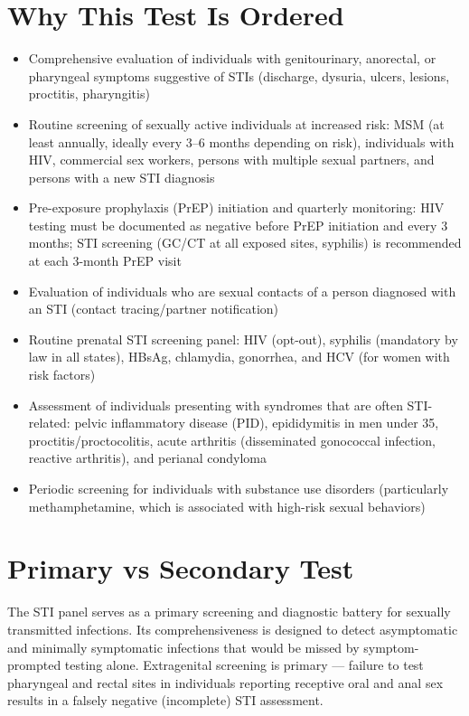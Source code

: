\section*{Why This Test Is Ordered}
\begin{itemize}
  \item Comprehensive evaluation of individuals with genitourinary, anorectal, or pharyngeal symptoms suggestive of STIs (discharge, dysuria, ulcers, lesions, proctitis, pharyngitis)
  \item Routine screening of sexually active individuals at increased risk: MSM (at least annually, ideally every 3--6 months depending on risk), individuals with HIV, commercial sex workers, persons with multiple sexual partners, and persons with a new STI diagnosis
  \item Pre-exposure prophylaxis (PrEP) initiation and quarterly monitoring: HIV testing must be documented as negative before PrEP initiation and every 3 months; STI screening (GC/CT at all exposed sites, syphilis) is recommended at each 3-month PrEP visit
  \item Evaluation of individuals who are sexual contacts of a person diagnosed with an STI (contact tracing/partner notification)
  \item Routine prenatal STI screening panel: HIV (opt-out), syphilis (mandatory by law in all states), HBsAg, chlamydia, gonorrhea, and HCV (for women with risk factors)
  \item Assessment of individuals presenting with syndromes that are often STI-related: pelvic inflammatory disease (PID), epididymitis in men under 35, proctitis/proctocolitis, acute arthritis (disseminated gonococcal infection, reactive arthritis), and perianal condyloma
  \item Periodic screening for individuals with substance use disorders (particularly methamphetamine, which is associated with high-risk sexual behaviors)
\end{itemize}

\section*{Primary vs Secondary Test}
The STI panel serves as a primary screening and diagnostic battery for sexually transmitted infections. Its comprehensiveness is designed to detect asymptomatic and minimally symptomatic infections that would be missed by symptom-prompted testing alone. Extragenital screening is primary --- failure to test pharyngeal and rectal sites in individuals reporting receptive oral and anal sex results in a falsely negative (incomplete) STI assessment.


